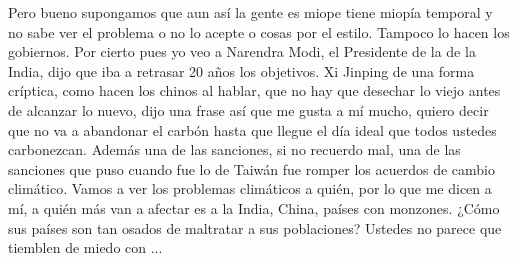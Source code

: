 Pero bueno supongamos que aun así la gente es miope tiene miopía temporal y no sabe ver el problema o no lo acepte o cosas por el estilo. Tampoco lo hacen los gobiernos. Por cierto pues yo veo a Narendra Modi, el Presidente de la de la India, dijo que iba a retrasar 20 años los objetivos. Xi Jinping de una forma críptica, como hacen los chinos al hablar, que no hay que desechar lo viejo antes de alcanzar lo nuevo, dijo una frase así que me gusta a mí mucho, quiero decir que no va a abandonar el carbón hasta que llegue el día ideal que todos ustedes carbonezcan. Además una de las sanciones, si no recuerdo mal, una de las sanciones que puso cuando fue lo de Taiwán fue romper los acuerdos de cambio climático. Vamos a ver los problemas climáticos a quién, por lo que me dicen a mí, a quién más van a afectar es a la India, China, países con monzones. ¿Cómo sus países son tan osados de maltratar a sus poblaciones? Ustedes no parece que tiemblen de miedo con ... 

